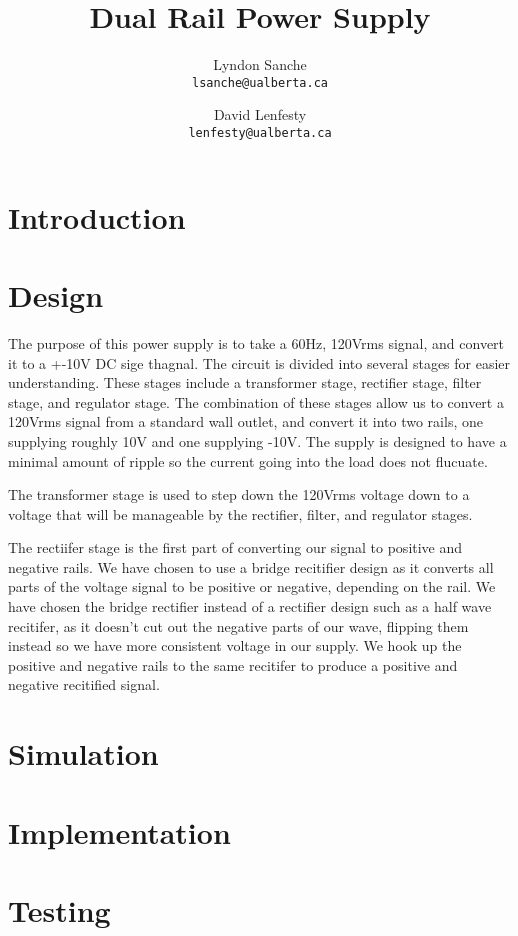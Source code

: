 \documentclass{article}
\title{Dual Rail Power Supply}
\author{
    Lyndon Sanche\\
    \texttt{lsanche@ualberta.ca}
    \and
    David Lenfesty\\
    \texttt{lenfesty@ualberta.ca}
}
\begin{document}
\maketitle
\newpage
\tableofcontents

\section{Introduction}

\section{Design}
The purpose of this power supply is to take a 60Hz, 120Vrms signal, and convert it to a +-10V DC sige thagnal. The circuit is divided into
several stages for easier understanding. These stages include a transformer stage, rectifier stage, filter stage, and regulator stage. The combination 
of these stages allow us to convert a 120Vrms signal from a standard wall outlet, and convert it into two rails, one supplying roughly 10V and one supplying -10V. 
The supply is designed to have a minimal amount of ripple so the current going into the load does not flucuate.

The transformer stage is used to step down the 120Vrms voltage down to a voltage that will be manageable by the rectifier, filter, and regulator stages.

The rectiifer stage is the first part of converting our signal to positive and negative rails. We have chosen to use a bridge recitifier design as it converts all parts of the voltage signal 
to be positive or negative, depending on the rail. We have chosen the bridge rectifier instead of a rectifier design such as a half wave recitifer, as it doesn't cut out the negative parts of our wave, flipping them instead 
so we have more consistent voltage in our supply. We hook up the positive and negative rails to the same recitifer to produce a positive and negative recitified signal.


\section{Simulation}

\section{Implementation}

\section{Testing}
\end{document}
